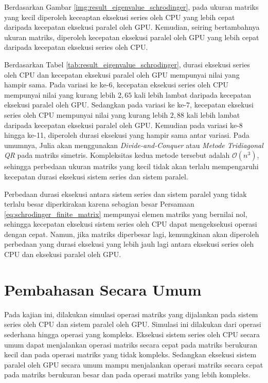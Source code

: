 Berdasarkan Gambar \ref{img:result_eigenvalue_schrodinger}, pada ukuran matriks yang kecil diperoleh keceaptan eksekusi series oleh CPU yang lebih cepat daripada kecepatan eksekusi paralel oleh GPU. Kemudian, seiring bertambahnya ukuran matriks, diperoleh kecepatan eksekusi paralel oleh GPU yang lebih cepat daripada kecepatan eksekusi series oleh CPU.

Berdasarkan Tabel \ref{tab:result_eigenvalue_schrodinger}, durasi eksekusi series oleh CPU dan kecepatan eksekusi paralel oleh GPU mempunyai nilai yang hampir sama. Pada variasi ke ke-6, kecepatan eksekusi series oleh CPU mempunyai nilai yang kurang lebih $2,65$ kali lebih lambat daripada kecepatan eksekusi paralel oleh GPU. Sedangkan pada variasi ke ke-7, kecepatan eksekusi series oleh CPU mempunyai nilai yang kurang lebih $2,88$ kali lebih lambat daripada kecepatan eksekusi paralel oleh GPU. Kemudian pada variasi ke-8 hingga ke-11, diperoleh durasi eksekusi yang hampir sama antar variasi. Pada umumnya, Julia akan menggunakan \emph{Divide-and-Conquer} atau \emph{Metode Tridiagonal QR} pada matriks simetris. Kompleksitas kedua metode tersebut adalah $\mathcal{O}(n^3)$, sehingga perbedaan ukuran matriks yang kecil tidak akan terlalu mempengaruhi kecepatan durasi eksekusi sistem series dan sistem paralel.

Perbedaan durasi eksekusi antara sistem series dan sistem paralel yang tidak terlalu besar diperkirakan karena sebagian besar Persamaan \ref{eq:schrodinger_finite_matrix} mempunyai elemen matriks yang bernilai nol, sehingga kecepatan eksekusi sistem series oleh CPU dapat mengeksekusi operasi dengan cepat. Namun, jika matriks diperbesar lagi, kemungkinan akan diperoleh perbedaan yang durasi eksekusi yang lebih jauh lagi antara eksekusi series oleh CPU dan eksekusi paralel oleh GPU.

\section{Pembahasan Secara Umum}

Pada kajian ini, dilakukan simulasi operasi matriks yang dijalankan pada sistem series oleh CPU dan sistem paralel oleh GPU. Simulasi ini dilakukan dari operasi sederhana hingga operasi yang kompleks. Eksekusi sistem series oleh CPU secara umum dapat menjalankan operasi matriks secara cepat pada matriks berukuran kecil dan pada operasi matriks yang tidak kompleks. Sedangkan eksekusi sistem paralel oleh GPU secara umum mampu menjalankan operasi matriks secara cepat pada matriks berukuran besar dan pada operasi matriks yang lebih kompleks.

